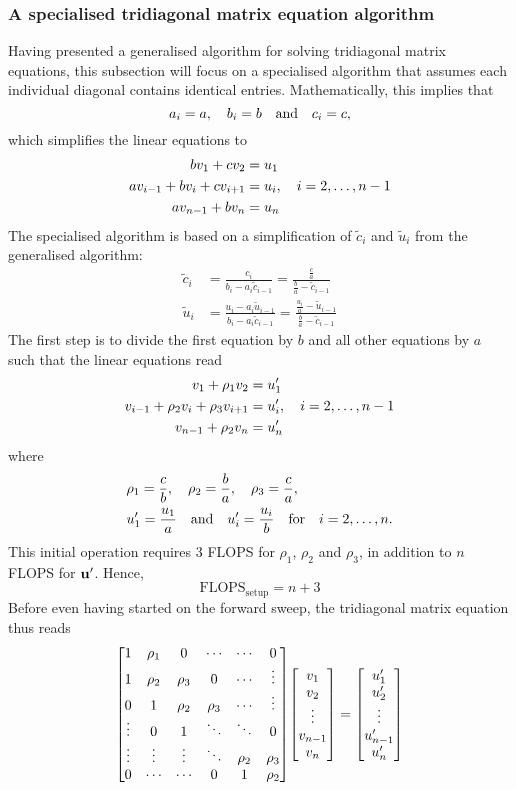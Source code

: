 \documentclass[reprint,english]{revtex4-1}
\begin{document}
\subsubsection{A specialised tridiagonal matrix equation algorithm}\label{sec:special_tridiagonal_algorithm}
Having presented a generalised algorithm for solving tridiagonal matrix equations, this subsection will focus on a specialised algorithm that assumes each individual diagonal contains identical entries. Mathematically, this implies that
\[a_i=a\qc b_i=b\qand c_i=c,\]
which simplifies the linear equations to
\begin{align*}
bv_1+cv_2&=u_1\\
av_{i-1}+bv_i+cv_{i+1}&=u_i\qc i=2,\ldots,n-1\\
av_{n-1}+bv_n&=u_n
\end{align*}
The specialised algorithm is based on a simplification of \(\tilde{c}_i\) and \(\tilde{u}_i\) from the generalised algorithm:
\begin{align*}
\tilde{c}_i&=\frac{c_i}{b_i-a_i\tilde{c}_{i-1}}=\frac{\frac{c}{a}}{\frac{b}{a}-\tilde{c}_{i-1}}\\
\tilde{u}_i&=\frac{u_i-a_i\tilde{u}_{i-1}}{b_i-a_i\tilde{c}_{i-1}}=\frac{\frac{u_i}{a}-\tilde{u}_{i-1}}{\frac{b}{a}-\tilde{c}_{i-1}}
\end{align*}
The first step is to divide the first equation by \(b\) and all other equations by \(a\) such that the linear equations read
\begin{align*}
v_1+\rho_1v_2&=u'_1\\
v_{i-1}+\rho_2v_i+\rho_3v_{i+1}&=u'_i\qc i=2,\ldots,n-1\\
v_{n-1}+\rho_2v_n&=u'_n
\end{align*}
where
\begin{align*}
&\rho_1=\frac{c}{b}\qc\rho_2=\frac{b}{a}\qc\rho_3=\frac{c}{a},\\
&u'_1=\frac{u_1}{a}\qand u'_i=\frac{u_i}{b}\qq{for}i=2,\ldots,n.
\end{align*}
This initial operation requires 3 FLOPS for \(\rho_1\), \(\rho_2\) and \(\rho_3\), in addition to \(n\) FLOPS for \(\vb{u}'\). Hence,
\begin{equation}
\text{FLOPS}_{\text{setup}}=n+3
\end{equation}
Before even having started on the forward sweep, the tridiagonal matrix equation thus reads
\[\mqty[1 & \rho_1 & 0 & \cdots & \cdots & 0 \\
1 & \rho_2 & \rho_3 & 0 & \cdots & \vdots \\
0 & 1 & \rho_2 & \rho_3 & \cdots & \vdots \\
\vdots & 0 & 1 & \ddots & \ddots & 0 \\
\vdots & \vdots & \vdots & \ddots & \rho_2 & \rho_3 \\
0 & \cdots & \cdots & 0 & 1 & \rho_2]\mqty[v_1 \\ v_2 \\ \vdots \\ v_{n-1} \\ v_n]=\mqty[u'_1 \\ u'_2 \\ \vdots \\ u'_{n-1} \\ u'_n]\]
\end{document}
